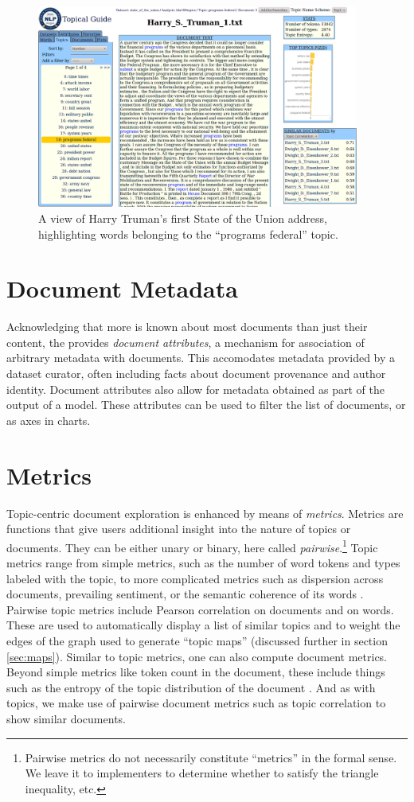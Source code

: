 \documentclass[11pt]{article}
\begin{document}
\begin{figure}[t]
 \centering
 \includegraphics[width=400px,keepaspectratio=true]{./topic_document_view.png}
 \caption{A view of Harry Truman's first State of the Union address, highlighting words belonging to the ``programs federal'' topic.}
 \label{fig:topic_doc}
\end{figure}

\section{Document Metadata}
Acknowledging that more is known about most documents than just their content,
the \tool{} provides \textit{document attributes}, a mechanism for association
of arbitrary metadata with documents. This accomodates metadata
provided by a dataset curator, often including facts about document
provenance and author identity. Document attributes also allow for metadata
obtained as part of the output of a model. These attributes can be used to
filter the list of documents, or as axes in charts.

\section{Metrics}
Topic-centric document exploration is enhanced by means of \textit{metrics}.
Metrics are functions that give users additional insight into the nature of
topics or documents. They can be either unary or binary, here called
\textit{pairwise}.\footnote{Pairwise metrics do not necessarily constitute
``metrics'' in the formal sense. We leave it to implementers to determine
whether to satisfy the triangle inequality, etc.} Topic metrics range from
simple metrics, such as the number of word tokens and types labeled with the
topic, to more complicated metrics such as dispersion across documents,
prevailing sentiment, or the semantic coherence of its words \cite{Newman2010}.
Pairwise topic metrics include Pearson correlation on documents and on words.
These are used to automatically display a list of similar topics and to weight
the edges of the graph used to generate ``topic maps'' (discussed further in section
\ref{sec:maps}). Similar to topic metrics, one can also compute document
metrics. Beyond simple metrics like token count in the document, these include
things such as the entropy of the topic distribution of the document \cite{Misra2008}. And as
with topics, we make use of pairwise document metrics such as topic
correlation \cite{Blei2009} to show similar documents.
\end{document}

